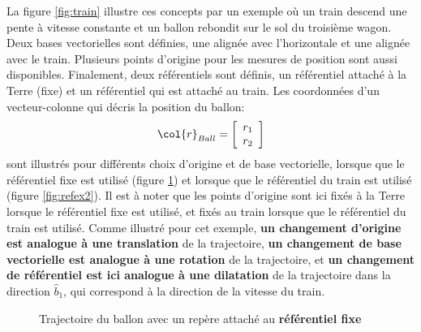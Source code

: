 La figure \ref{fig:train} illustre ces concepts par un exemple où un train descend une pente à vitesse constante et un ballon rebondit sur le sol du troisième wagon. Deux bases vectorielles sont définies, une alignée avec l'horizontale et une alignée avec le train. Plusieurs points d'origine pour les mesures de position sont aussi disponibles. Finalement, deux référentiels sont définis, un référentiel attaché à la Terre (fixe) et un référentiel qui est attaché au train. Les coordonnées d'un vecteur-colonne qui décris la position du ballon:
\begin{equation}
\col{r}_{Ball} = \left[ \begin{array}{c} r_1 \\ r_2 \end{array} \right]
\end{equation}
sont illustrés pour différents choix d'origine et de base vectorielle, lorsque que le référentiel fixe est utilisé (figure \ref{fig:refex1}) et lorsque que le référentiel du train est utilisé (figure \ref{fig:refex2}). Il est à noter que les points d'origine sont ici fixés à la Terre lorsque le référentiel fixe est utilisé, et fixés au train lorsque que le référentiel du train est utilisé. Comme illustré pour cet exemple, \textbf{un changement d'origine est analogue à une translation} de la trajectoire, \textbf{un changement de base vectorielle est analogue à une rotation} de la trajectoire, et \textbf{un changement de référentiel est ici analogue à une dilatation} de la trajectoire dans la direction $\hat{b}_1$, qui correspond à la direction de la vitesse du train. 

\begin{figure}[p]
        \centering
         \hspace{20pt}
				 \hspace{190pt}
				 \hspace{20pt}
        \caption{Trajectoire du ballon avec un repère attaché au \textbf{référentiel fixe}}
				\label{fig:refex1}
\end{figure}


